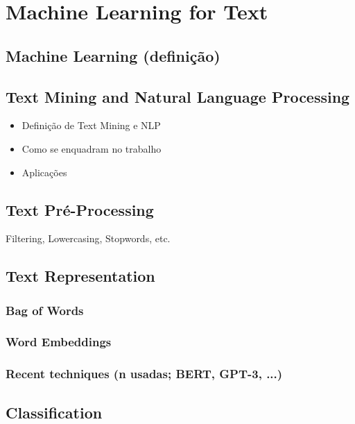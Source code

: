 \chapter{Machine Learning for Text}\label{cap:ml_text}

\section{Machine Learning (definição)}

\section{Text Mining and Natural Language Processing}

\begin{itemize}
    \setlength\itemsep{-0.5em}
    \item Definição de Text Mining e NLP
    \item Como se enquadram no trabalho
    \item Aplicações
\end{itemize}

\section{Text Pré-Processing}

Filtering, Lowercasing, Stopwords, etc.

\section{Text Representation}

\subsection{Bag of Words}

\subsection{Word Embeddings}

\subsection{Recent techniques (n usadas; BERT, GPT-3, ...)}

\section{Classification}

